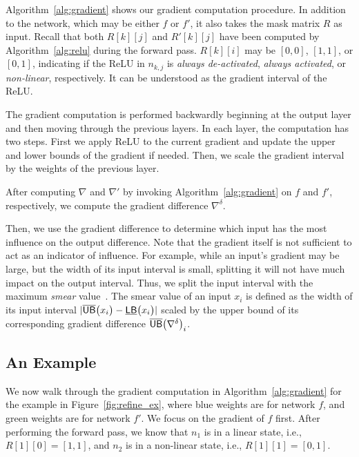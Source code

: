 Algorithm~\ref{alg:gradient} shows our gradient computation procedure.
In addition to the network, which may be either $f$ or $f'$, it also
takes the mask matrix $R$ as input.  Recall that both $R[k][j]$ and
$R'[k][j]$ have been computed by Algorithm~\ref{alg:relu} during the
forward pass.  $R[k][i]$ may be $[0,0]$, $[1,1]$, or $[0,1]$,
indicating if the ReLU in $n_{k,j}$ is \emph{always
de-activated}, \emph{always activated}, or \emph{non-linear},
respectively.  It can be understood as the gradient interval of the
ReLU.

The gradient computation is performed backwardly beginning at the
output layer and then moving through the previous layers. In each
layer, the computation has two steps. First we apply ReLU to the
current gradient and update the upper and lower bounds of the gradient
if needed. Then, we scale the gradient interval by the weights of the previous
layer.


After computing $\nabla$ and $\nabla'$ by invoking
Algorithm~\ref{alg:gradient} on $f$ and $f'$, respectively, we compute
the gradient difference $\nabla^\delta$.


Then, we use the gradient difference to determine which input has the
most influence on the output difference.  Note that the gradient
itself is not sufficient to act as an indicator of influence.  For
example, while an input's gradient may be large, but the width of
its input interval is small, splitting it will not have much impact on
the output interval.
%
Thus, we split the input interval with the maximum \textit{smear}
value~\cite{kearfott1990algorithm, kearfott2013rigorous}.  The smear value of an input $x_i$ is defined as the width
of its input interval $|\overline{\mathsf{UB}}\big(x_i\big) - \underline{\mathsf{LB}}\big(x_i\big)|$ scaled
by the upper bound of its corresponding gradient difference
$\overline{\mathsf{UB}}\big(\nabla^\delta\big)_i$.



\subsection{An Example}

We now walk through the gradient computation in
Algorithm~\ref{alg:gradient} for the example in
Figure~\ref{fig:refine_ex}, where blue weights are for network $f$,
and green weights are for network $f'$.  We focus on the gradient of
$f$ first.  After performing the forward pass, we know that $n_1$ is
in a linear state, i.e., $ R[1][0] = [1,1] $, and $ n_2 $ is in a
non-linear state, i.e., $ R[1][1] = [0,1] $.


